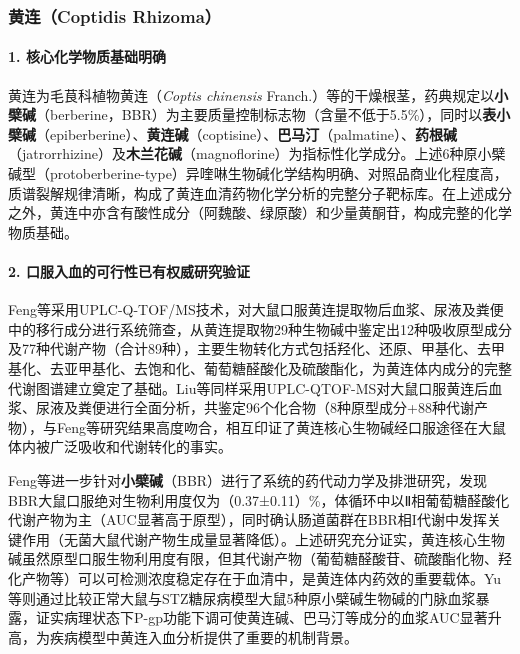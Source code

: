 \documentclass[12pt,a4paper,UTF8,scheme=chinese]{ctexart}
\newcommand{\compoundname}[1]{\textbf{#1}}
\newcommand{\herbname}[1]{\textit{#1}}
\begin{document}
\subsubsection{黄连（Coptidis Rhizoma）}

\paragraph{1. 核心化学物质基础明确}

黄连为毛茛科植物黄连（\herbname{Coptis chinensis} Franch.）等的干燥根茎，药典规定以\compoundname{小檗碱}（berberine，BBR）为主要质量控制标志物（含量不低于5.5\%），同时以\compoundname{表小檗碱}（epiberberine）、\compoundname{黄连碱}（coptisine）、\compoundname{巴马汀}（palmatine）、\compoundname{药根碱}（jatrorrhizine）及\compoundname{木兰花碱}（magnoflorine）为指标性化学成分。上述6种原小檗碱型（protoberberine-type）异喹啉生物碱化学结构明确、对照品商业化程度高，质谱裂解规律清晰，构成了黄连血清药物化学分析的完整分子靶标库\cite{FengX2020}。在上述成分之外，黄连中亦含有酸性成分（阿魏酸、绿原酸）和少量黄酮苷，构成完整的化学物质基础。

\paragraph{2. 口服入血的可行性已有权威研究验证}

Feng等\cite{FengX2020}采用UPLC-Q-TOF/MS技术，对大鼠口服黄连提取物后血浆、尿液及粪便中的移行成分进行系统筛查，从黄连提取物29种生物碱中鉴定出12种吸收原型成分及77种代谢产物（合计89种），主要生物转化方式包括羟化、还原、甲基化、去甲基化、去亚甲基化、去饱和化、葡萄糖醛酸化及硫酸酯化，为黄连体内成分的完整代谢图谱建立奠定了基础。Liu等\cite{LiuYi2020}同样采用UPLC-QTOF-MS对大鼠口服黄连后血浆、尿液及粪便进行全面分析，共鉴定96个化合物（8种原型成分+88种代谢产物），与Feng等研究结果高度吻合，相互印证了黄连核心生物碱经口服途径在大鼠体内被广泛吸收和代谢转化的事实。

Feng等\cite{FengX2021}进一步针对\compoundname{小檗碱}（BBR）进行了系统的药代动力学及排泄研究，发现BBR大鼠口服绝对生物利用度仅为（0.37±0.11）\%，体循环中以Ⅱ相葡萄糖醛酸化代谢产物为主（AUC显著高于原型），同时确认肠道菌群在BBR相I代谢中发挥关键作用（无菌大鼠代谢产物生成量显著降低）。上述研究充分证实，黄连核心生物碱虽然原型口服生物利用度有限，但其代谢产物（葡萄糖醛酸苷、硫酸酯化物、羟化产物等）可以可检测浓度稳定存在于血清中，是黄连体内药效的重要载体。Yu等\cite{Yu2010}则通过比较正常大鼠与STZ糖尿病模型大鼠5种原小檗碱生物碱的门脉血浆暴露，证实病理状态下P-gp功能下调可使黄连碱、巴马汀等成分的血浆AUC显著升高，为疾病模型中黄连入血分析提供了重要的机制背景。
\end{document}
